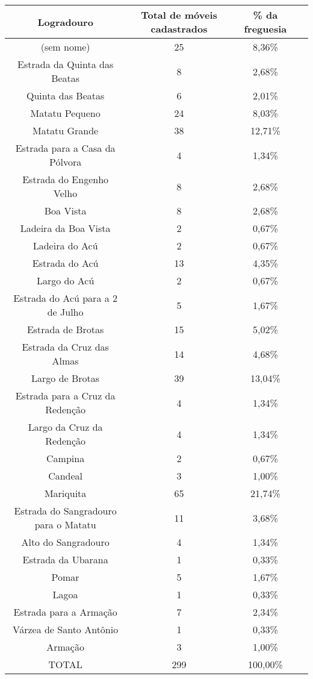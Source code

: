 \begin{table}[!htp]
\centering
{}
{\begin{tabular}{cccc}
\hline
Logradouro	&Total de móveis cadastrados	&\% da freguesia	&\\
\hline\hline
(sem nome)	&25	&8,36\%	&\\
Estrada da Quinta das Beatas	&8	&2,68\%	&\\
Quinta das Beatas	&6	&2,01\%	&\\
Matatu Pequeno	&24	&8,03\%	&\\
Matatu Grande	&38	&12,71\%	&\\
Estrada para a Casa da Pólvora	&4	&1,34\%	&\\
Estrada do Engenho Velho	&8	&2,68\%	&\\
Boa Vista	&8	&2,68\%	&\\
Ladeira da Boa Vista	&2	&0,67\%	&\\
Ladeira do Acú	&2	&0,67\%	&\\
Estrada do Acú	&13	&4,35\%	&\\
Largo do Acú	&2	&0,67\%	&\\
Estrada do Acú para a 2 de Julho	&5	&1,67\%	&\\
Estrada de Brotas	&15	&5,02\%	&\\
Estrada da Cruz das Almas	&14	&4,68\%	&\\
Largo de Brotas	&39	&13,04\%	&\\
Estrada para a Cruz da Redenção	&4	&1,34\%	&\\
Largo da Cruz da Redenção	&4	&1,34\%	&\\
Campina	&2	&0,67\%	&\\
Candeal	&3	&1,00\%	&\\
Mariquita	&65	&21,74\%	&\\
Estrada do Sangradouro para o Matatu	&11	&3,68\%	&\\
Alto do Sangradouro	&4	&1,34\%	&\\
Estrada da Ubarana	&1	&0,33\%	&\\
Pomar	&5	&1,67\%	&\\
Lagoa	&1	&0,33\%	&\\
Estrada para a Armação	&7	&2,34\%	&\\
Várzea de Santo Antônio	&1	&0,33\%	&\\
Armação	&3	&1,00\%	&\\
\hline
TOTAL	&299	&100,00\%	&\\
\hline
\end{tabular} }{  }
\end{table}
